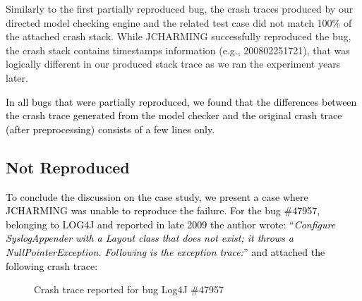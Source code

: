 \documentclass[times, doublespace]{smrauth}
\newcommand{\red}[1]{\textcolor{black}{#1}}
\begin{document}
Similarly to the first partially reproduced bug, the crash traces produced by our
directed model checking engine and the related test case did not match 100\% of
the attached crash stack.
While JCHARMING successfully reproduced the bug, the crash stack contains
timestamps information (e.g., 200802251721),
that was logically different in our produced stack trace as we ran the experiment
years later.

\red{In all bugs that were partially reproduced, we found that the
differences between the crash trace generated from the model
checker and the original crash trace (after preprocessing)
consists of a few lines only.}

\subsection{Not Reproduced}

\red{To conclude the discussion on the case study, we present a
case where JCHARMING was unable to reproduce the failure.
For the bug \#47957, belonging to LOG4J and reported in late
2009 the author wrote: ``{\it Configure SyslogAppender with a Layout class that does not
exist; it throws a NullPointerException. Following is the
exception trace:}'' and attached the following crash trace:}

\begin{figure}[H]

\noindent{}

\caption{Crash trace reported for bug Log4J \#47957\label{fig:log4j}}
\end{figure}
\end{document}
